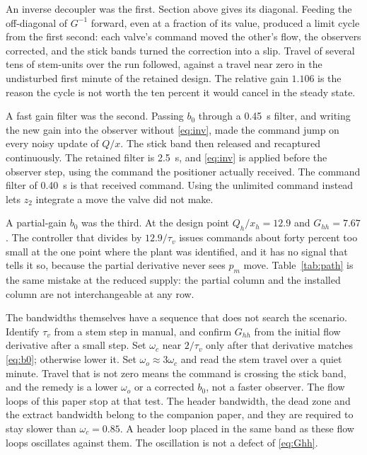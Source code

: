 \documentclass[conference,a4paper]{IEEEtran}
\begin{document}
An inverse decoupler was the first. Section above gives its diagonal. Feeding the off-diagonal of $G^{-1}$ forward, even at a fraction of its value, produced a limit cycle from the first second: each valve's command moved the other's flow, the observers corrected, and the stick bands turned the correction into a slip. Travel of several tens of stem-units over the run followed, against a travel near zero in the undisturbed first minute of the retained design. The relative gain $1.106$ is the reason the cycle is not worth the ten percent it would cancel in the steady state.

A fast gain filter was the second. Passing $b_0$ through a \SI{0.45}{s} filter, and writing the new gain into the observer without \eqref{eq:inv}, made the command jump on every noisy update of $Q/x$. The stick band then released and recaptured continuously. The retained filter is \SI{2.5}{s}, and \eqref{eq:inv} is applied before the observer step, using the command the positioner actually received. The command filter of \SI{0.40}{s} is that received command. Using the unlimited command instead lets $z_2$ integrate a move the valve did not make.

A partial-gain $b_0$ was the third. At the design point $Q_h/x_h=12.9$ and $G_{hh}=7.67$. The controller that divides by $12.9/\tau_v$ issues commands about forty percent too small at the one point where the plant was identified, and it has no signal that tells it so, because the partial derivative never sees $p_m$ move. Table~\ref{tab:path} is the same mistake at the reduced supply: the partial column and the installed column are not interchangeable at any row.

The bandwidths themselves have a sequence that does not search the scenario. Identify $\tau_v$ from a stem step in manual, and confirm $G_{hh}$ from the initial flow derivative after a small step. Set $\omega_c$ near $2/\tau_v$ only after that derivative matches \eqref{eq:b0}; otherwise lower it. Set $\omega_o\approx 3\omega_c$ and read the stem travel over a quiet minute. Travel that is not zero means the command is crossing the stick band, and the remedy is a lower $\omega_o$ or a corrected $b_0$, not a faster observer. The flow loops of this paper stop at that test. The header bandwidth, the dead zone and the extract bandwidth belong to the companion paper, and they are required to stay slower than $\omega_c=0.85$. A header loop placed in the same band as these flow loops oscillates against them. The oscillation is not a defect of \eqref{eq:Ghh}.
\end{document}
